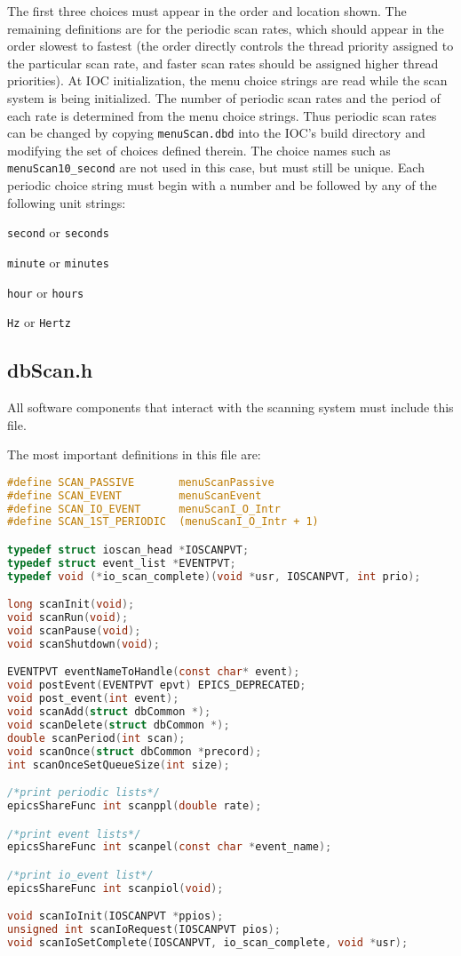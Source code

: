The first three choices must appear in the order and location shown.
The remaining definitions are for the periodic scan rates, which should appear in the order slowest to fastest (the order directly controls the thread priority assigned to the particular scan rate, and faster scan rates should be assigned higher thread priorities).
At IOC initialization, the menu choice strings are read while the scan system is being initialized.
The number of periodic scan rates and the period of each rate is determined from the menu choice strings.
Thus periodic scan rates can be changed by copying \verb|menuScan.dbd| into the IOC's build directory and modifying the set of choices defined therein.
The choice names such as \verb|menuScan10_second| are not used in this case, but must still be unique.
Each periodic choice string must begin with a number and be followed by any of the following unit strings:

\begin{description}
\item \verb|second| or \verb|seconds|
\item \verb|minute| or \verb|minutes|
\item \verb|hour| or \verb|hours|
\item \verb|Hz| or \verb|Hertz|
\end{description}

\subsection{dbScan.h}

All software components that interact with the scanning system must include this file.

The most important definitions in this file are:

\begin{lstlisting}[language=C]
#define SCAN_PASSIVE       menuScanPassive
#define SCAN_EVENT         menuScanEvent
#define SCAN_IO_EVENT      menuScanI_O_Intr
#define SCAN_1ST_PERIODIC  (menuScanI_O_Intr + 1)

typedef struct ioscan_head *IOSCANPVT;
typedef struct event_list *EVENTPVT;
typedef void (*io_scan_complete)(void *usr, IOSCANPVT, int prio);

long scanInit(void);
void scanRun(void);
void scanPause(void);
void scanShutdown(void);

EVENTPVT eventNameToHandle(const char* event);
void postEvent(EVENTPVT epvt) EPICS_DEPRECATED;
void post_event(int event);
void scanAdd(struct dbCommon *);
void scanDelete(struct dbCommon *);
double scanPeriod(int scan);
void scanOnce(struct dbCommon *precord);
int scanOnceSetQueueSize(int size);

/*print periodic lists*/
epicsShareFunc int scanppl(double rate);

/*print event lists*/
epicsShareFunc int scanpel(const char *event_name);

/*print io_event list*/
epicsShareFunc int scanpiol(void);

void scanIoInit(IOSCANPVT *ppios);
unsigned int scanIoRequest(IOSCANPVT pios);
void scanIoSetComplete(IOSCANPVT, io_scan_complete, void *usr);
\end{lstlisting}

